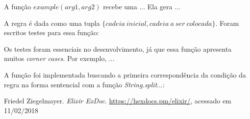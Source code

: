\documentclass[conference]{IEEEtran}
\begin{document}
A função $example(arg1, arg2)$ recebe uma ... Ela gera ...

A regra é dada como uma tupla $\{cadeia\ inicial, cadeia\ a\ ser\ colocada\}$. Foram escritos testes para essa função:

% 

Os testes foram essenciais no desenvolvimento, já que essa função apresenta muitos \emph{corner cases}. Por exemplo, ...

A função foi implementada buscando a primeira correspondência da condição da regra na forma sentencial com a função \emph{String.split}...:

% 

\begin{thebibliography}{1}
Friedel Ziegelmayer. \emph{Elixir ExDoc}. \url{https://hexdocs.pm/elixir/}, acessado em 11/02/2018
\end{thebibliography}
\end{document}
